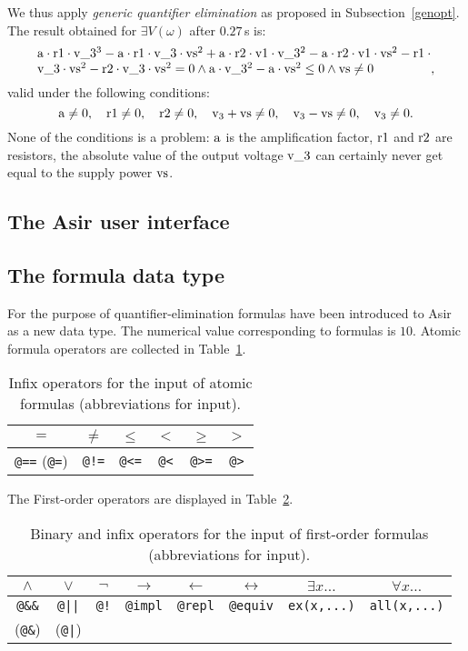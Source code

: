 We thus apply {\em generic quantifier elimination} as proposed in
Subsection~\ref{genopt}. The result obtained for $\exists V(\omega)$
after $0.27$\,s is:
$$\vbox{\hsize=0.9\textwidth\noindent$\rm
a\cdot r1\cdot v\_3^3 - a\cdot r1\cdot v\_3\cdot vs^2 + a\cdot r2\cdot
v1\cdot v\_3^2 - a\cdot r2\cdot v1\cdot vs^2 - r1\cdot v\_3\cdot vs^2 -
r2\cdot v\_3\cdot vs^2 = 0 \land a\cdot v\_3^2 - a\cdot vs^2 \leq 0 \land
vs \neq 0$},
$$
valid under the following conditions:
$$\rm
a \neq 0,\quad r1 \neq 0,\quad r2 \neq 0,\quad v_3 + vs \neq 0,\quad
v_3 - vs \neq 0,\quad v_3 \neq 0.
$$
None of the conditions is a problem: $\rm a$ is the amplification
factor, $\rm r1$ and $\rm r2$ are resistors, the absolute value of the 
output voltage $\rm v\_3$ can certainly never get equal to the supply
power $\rm vs$.
%
\begin{appendix}
\section{The Asir user interface}\label{doku}
\subsection{The formula data type}
For the purpose of quantifier-elimination formulas have been
introduced to Asir as a new data type. The numerical value
corresponding to formulas is $10$. Atomic formula operators are
collected in Table~\ref{atoptab}.
\begin{table}
\begin{center}
\begin{tabular}{c|c|c|c|c|c}
$=$ & $\neq$ & $\leq$ & $<$ & $\geq$ & $>$\\
\hline
\verb"@==" (\verb"@=") & \verb"@!=" & \verb"@<=" & \verb"@<" &
\verb"@>=" & \verb"@>"\\
\end{tabular}
\caption{Infix operators for the input of atomic formulas
(abbreviations for input).\label{atoptab}}
\end{center}
\end{table}
The First-order operators are displayed in Table~\ref{coptab}.
\begin{table}
\begin{center}
\begin{tabular}{c|c|c|c|c|c|c|c}
$\land$ & $\lor$ & $\lnot$ & $\longrightarrow$ & $\longleftarrow$ &
$\longleftrightarrow$ & $\exists x\ldots$ & $\forall x\ldots$\\
\hline
\verb"@&&" & \verb"@||" & \verb"@!" & \verb"@impl" & \verb"@repl" &
\verb"@equiv" & \verb"ex(x,...)" & \verb"all(x,...)" \\
(\verb"@&") & (\verb"@|") & & & & & &\\
\end{tabular}
\caption{Binary and infix operators for the input of first-order
formulas (abbreviations for input).\label{coptab}}
\end{center}
\end{table}


\end{appendix}
